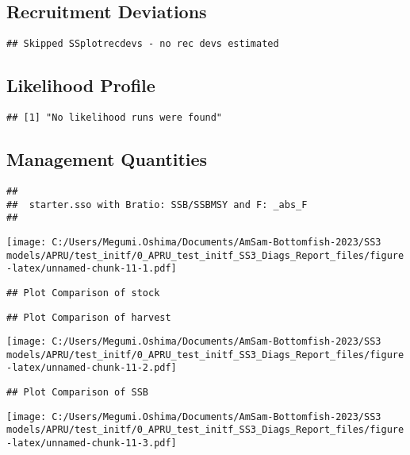 \documentclass[
]{article}
\begin{document}
\hypertarget{recruitment-deviations}{%
\subsection{Recruitment Deviations}\label{recruitment-deviations}}

\begin{verbatim}
## Skipped SSplotrecdevs - no rec devs estimated
\end{verbatim}

\hypertarget{likelihood-profile}{%
\subsection{Likelihood Profile}\label{likelihood-profile}}

\begin{verbatim}
## [1] "No likelihood runs were found"
\end{verbatim}

\hypertarget{management-quantities}{%
\subsection{Management Quantities}\label{management-quantities}}

\begin{verbatim}
## 
##  starter.sso with Bratio: SSB/SSBMSY and F: _abs_F 
## 
\end{verbatim}

\texttt{[image: C:/Users/Megumi.Oshima/Documents/AmSam-Bottomfish-2023/SS3 models/APRU/test\_initf/0\_APRU\_test\_initf\_SS3\_Diags\_Report\_files/figure-latex/unnamed-chunk-11-1.pdf]}

\begin{verbatim}
## Plot Comparison of stock
\end{verbatim}

\begin{verbatim}
## Plot Comparison of harvest
\end{verbatim}

\texttt{[image: C:/Users/Megumi.Oshima/Documents/AmSam-Bottomfish-2023/SS3 models/APRU/test\_initf/0\_APRU\_test\_initf\_SS3\_Diags\_Report\_files/figure-latex/unnamed-chunk-11-2.pdf]}

\begin{verbatim}
## Plot Comparison of SSB
\end{verbatim}

\texttt{[image: C:/Users/Megumi.Oshima/Documents/AmSam-Bottomfish-2023/SS3 models/APRU/test\_initf/0\_APRU\_test\_initf\_SS3\_Diags\_Report\_files/figure-latex/unnamed-chunk-11-3.pdf]}
\end{document}
